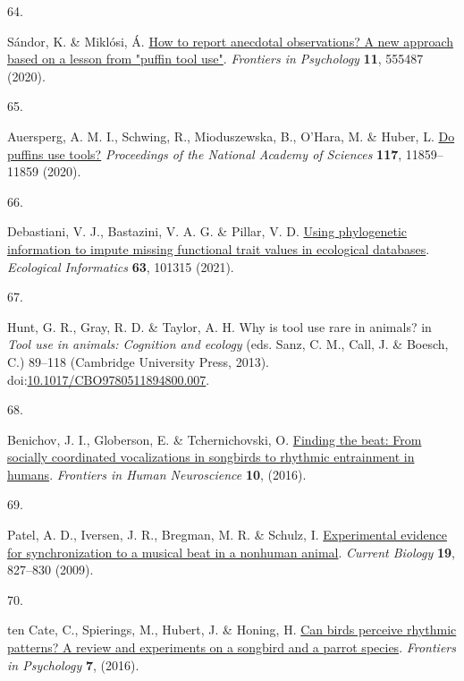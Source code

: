\documentclass[
  man,floatsintext]{apa6}
\newlength{\cslhangindent}
\newlength{\csllabelwidth}
\newlength{\cslentryspacingunit} %
\newenvironment{CSLReferences}[2] %
 {%
  \setlength{\parindent}{0pt}
  \ifodd #1
  \let\oldpar\par
  \def\par{\hangindent=\cslhangindent\oldpar}
  \fi
  \setlength{\parskip}{#2\cslentryspacingunit}
 }%
 {}
\newcommand{\CSLLeftMargin}[1]{\parbox[t]{\csllabelwidth}{#1}}
\newcommand{\CSLRightInline}[1]{\parbox[t]{\linewidth - \csllabelwidth}{#1}\break}
\begin{document}
\begin{CSLReferences}{0}{0}
\leavevmode{}%
\CSLLeftMargin{64. }%
\CSLRightInline{Sándor, K. \& Miklósi, Á. \href{https://doi.org/10.3389/fpsyg.2020.555487}{How to report anecdotal observations? A new approach based on a lesson from "puffin tool use"}. \emph{Frontiers in Psychology} \textbf{11}, 555487 (2020).}

\leavevmode{}%
\CSLLeftMargin{65. }%
\CSLRightInline{Auersperg, A. M. I., Schwing, R., Mioduszewska, B., O'Hara, M. \& Huber, L. \href{https://doi.org/10.1073/pnas.2001988117}{Do puffins use tools?} \emph{Proceedings of the National Academy of Sciences} \textbf{117}, 11859--11859 (2020).}

\leavevmode{}%
\CSLLeftMargin{66. }%
\CSLRightInline{Debastiani, V. J., Bastazini, V. A. G. \& Pillar, V. D. \href{https://doi.org/10.1016/j.ecoinf.2021.101315}{Using phylogenetic information to impute missing functional trait values in ecological databases}. \emph{Ecological Informatics} \textbf{63}, 101315 (2021).}

\leavevmode{}%
\CSLLeftMargin{67. }%
\CSLRightInline{Hunt, G. R., Gray, R. D. \& Taylor, A. H. Why is tool use rare in animals? in \emph{Tool use in animals: Cognition and ecology} (eds. Sanz, C. M., Call, J. \& Boesch, C.) 89--118 (Cambridge University Press, 2013). doi:\href{https://doi.org/10.1017/CBO9780511894800.007}{10.1017/CBO9780511894800.007}.}

\leavevmode{}%
\CSLLeftMargin{68. }%
\CSLRightInline{Benichov, J. I., Globerson, E. \& Tchernichovski, O. \href{https://doi.org/10.3389/fnhum.2016.00255}{Finding the beat: From socially coordinated vocalizations in songbirds to rhythmic entrainment in humans}. \emph{Frontiers in Human Neuroscience} \textbf{10}, (2016).}

\leavevmode{}%
\CSLLeftMargin{69. }%
\CSLRightInline{Patel, A. D., Iversen, J. R., Bregman, M. R. \& Schulz, I. \href{https://doi.org/10.1016/j.cub.2009.03.038}{Experimental evidence for synchronization to a musical beat in a nonhuman animal}. \emph{Current Biology} \textbf{19}, 827--830 (2009).}

\leavevmode{}%
\CSLLeftMargin{70. }%
\CSLRightInline{ten Cate, C., Spierings, M., Hubert, J. \& Honing, H. \href{https://doi.org/10.3389/fpsyg.2016.00730}{Can birds perceive rhythmic patterns? A review and experiments on a songbird and a parrot species}. \emph{Frontiers in Psychology} \textbf{7}, (2016).}


\end{CSLReferences}
\end{document}
